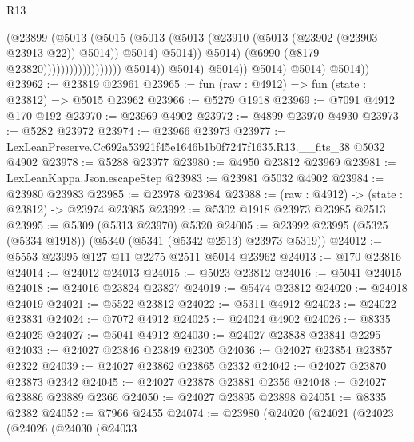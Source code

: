 \begin{lexlean}{R13}
\begin{coremodule}
                                                    (@23899
                                                      (@5013
                                                        (@5015
                                                          (@5013
                                                            (@5013
                                                              (@23910
                                                                (@5013
                                                                  (@23902 (@23903 @23913 @22))
                                                                  @5014))
                                                              @5014)
                                                            @5014))
                                                        @5014)
                                                      (@6990 (@8179 @23820))))))))))))))))))
                      @5014))
                  @5014)
                @5014))
            @5014)
          @5014)
        @5014))
@23962 := @23819 @23961
@23965 := fun (raw : @4912) => fun (state : @23812) => @5015 @23962
@23966 := @5279 @1918
@23969 := @7091 @4912 @170 @192
@23970 := @23969 @4902
@23972 := @4899 @23970 @4930
@23973 := @5282 @23972
@23974 := @23966 @23973
@23977 := LexLeanPreserve.Cc692a53921f45e1646b1b0f7247f1635.R13.__fits_38 @5032 @4902
@23978 := @5288 @23977
@23980 := @4950 @23812 @23969
@23981 := LexLeanKappa.Json.escapeStep
@23983 := @23981 @5032 @4902
@23984 := @23980 @23983
@23985 := @23978 @23984
@23988 := (raw : @4912) -> (state : @23812) -> @23974 @23985
@23992 := @5302 @1918 @23973 @23985 @2513
@23995 := @5309 (@5313 @23970) @5320
@24005 := @23992 @23995 (@5325 (@5334 @1918)) (@5340 (@5341 (@5342 @2513) @23973 @5319))
@24012 := @5553 @23995 @127 @11 @2275 @2511 @5014 @23962
@24013 := @170 @23816
@24014 := @24012 @24013
@24015 := @5023 @23812
@24016 := @5041 @24015
@24018 := @24016 @23824 @23827
@24019 := @5474 @23812
@24020 := @24018 @24019
@24021 := @5522 @23812
@24022 := @5311 @4912
@24023 := @24022 @23831
@24024 := @7072 @4912
@24025 := @24024 @4902
@24026 := @8335 @24025
@24027 := @5041 @4912
@24030 := @24027 @23838 @23841 @2295
@24033 := @24027 @23846 @23849 @2305
@24036 := @24027 @23854 @23857 @2322
@24039 := @24027 @23862 @23865 @2332
@24042 := @24027 @23870 @23873 @2342
@24045 := @24027 @23878 @23881 @2356
@24048 := @24027 @23886 @23889 @2366
@24050 := @24027 @23895 @23898
@24051 := @8335 @2382
@24052 := @7966 @2455
@24074 := @23980
    (@24020
      (@24021
        (@24023
          (@24026
            (@24030
              (@24033

\end{coremodule}
\end{lexlean}
